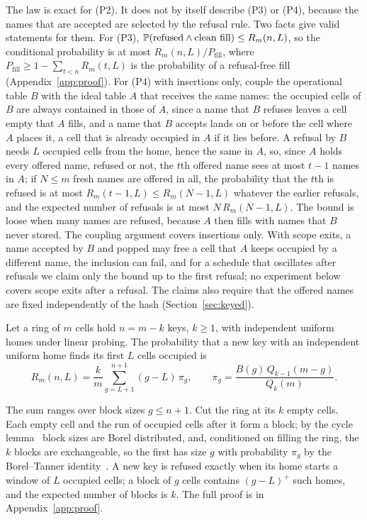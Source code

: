 The law is exact for (P2). It does not by itself describe (P3) or (P4), because the names that are accepted are selected by the refusal rule. Two facts give valid statements for them. For (P3), $\mathbb{P}(\text{refused}\wedge\text{clean fill})\le R_m(n,L)$, so the conditional probability is at most $R_m(n,L)/P_{\mathrm{fill}}$, where $P_{\mathrm{fill}}\ge1-\sum_{t<n}R_m(t,L)$ is the probability of a refusal-free fill (Appendix~\ref{app:proof}). For (P4) with insertions only, couple the operational table $B$ with the ideal table $A$ that receives the same names: the occupied cells of $B$ are always contained in those of $A$, since a name that $B$ refuses leaves a cell empty that $A$ fills, and a name that $B$ accepts lands on or before the cell where $A$ places it, a cell that is already occupied in $A$ if it lies before. A refusal by $B$ needs $L$ occupied cells from the home, hence the same in $A$, so, since $A$ holds every offered name, refused or not, the $t$th offered name sees at most $t-1$ names in $A$; if $N\le m$ fresh names are offered in all, the probability that the $t$th is refused is at most $R_m(t-1,L)\le R_m(N-1,L)$ whatever the earlier refusals, and the expected number of refusals is at most $N\,R_m(N-1,L)$. The bound is loose when many names are refused, because $A$ then fills with names that $B$ never stored. The coupling argument covers insertions only. With scope exits, a name accepted by $B$ and popped may free a cell that $A$ keeps occupied by a different name, the inclusion can fail, and for a schedule that oscillates after refusals we claim only the bound up to the first refusal; no experiment below covers scope exits after a refusal. The claims also require that the offered names are fixed independently of the hash (Section~\ref{sec:keyed}).

\begin{theorem}
\label{thm:law}
Let a ring of $m$ cells hold $n=m-k$ keys, $k\ge1$, with independent uniform homes under linear probing. The probability that a new key with an independent uniform home finds its first $L$ cells occupied is
\begin{equation}
R_m(n,L)=\frac{k}{m}\sum_{g=L+1}^{n+1}(g-L)\,\pi_g,\qquad \pi_g=\frac{B(g)\,Q_{k-1}(m-g)}{Q_k(m)}.
\label{eq:law}
\end{equation}
\end{theorem}

\begin{IEEEproof}
The sum ranges over block sizes $g\le n+1$. Cut the ring at its $k$ empty cells. Each empty cell and the run of occupied cells after it form a block; by the cycle lemma~\cite{dwass1969} block sizes are Borel distributed, and, conditioned on filling the ring, the $k$ blocks are exchangeable, so the first has size $g$ with probability $\pi_g$ by the Borel--Tanner identity~\cite{tanner1961}. A new key is refused exactly when its home starts a window of $L$ occupied cells; a block of $g$ cells contains $(g-L)^{+}$ such homes, and the expected number of blocks is $k$. The full proof is in Appendix~\ref{app:proof}.
\end{IEEEproof}

